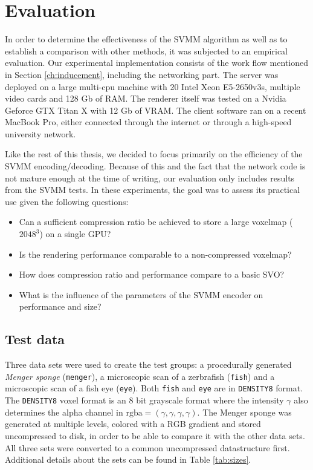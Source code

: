 \chapter{Evaluation}  \label{ch:evaluation}
%
In order to determine the effectiveness of the SVMM algorithm as well as to establish a comparison with other methods, it was subjected to an empirical evaluation. Our experimental implementation consists of the work flow mentioned in Section \ref{ch:inducement}, including the networking part. The server was deployed on a large multi-cpu machine with 20 Intel Xeon E5-2650v3s, multiple video cards and 128 Gb of RAM. The renderer itself was tested on a Nvidia Geforce GTX Titan X with 12 Gb of VRAM. The client software ran on a recent MacBook Pro, either connected through the internet or through a high-speed university network.

Like the rest of this thesis, we decided to focus primarily on the efficiency of the SVMM encoding/decoding. Because of this and the fact that the network code is not mature enough at the time of writing, our evaluation only includes results from the SVMM tests. In these experiments, the goal was to assess its practical use given the following questions:
\begin{itemize}
\item Can a sufficient compression ratio be achieved to store a large voxelmap ($2048^3$) on a single GPU?
\item Is the rendering performance comparable to a non-compressed voxelmap?
\item How does compression ratio and performance compare to a basic SVO?
\item What is the influence of the parameters of the SVMM encoder on performance and size?
\end{itemize}
%
\section{Test data}
%
Three data sets were used to create the test groups: a procedurally generated \emph{Menger sponge} (\texttt{menger}), a microscopic scan of a zerbrafish (\texttt{fish}) and a microscopic scan of a fish eye (\texttt{eye}). Both \texttt{fish} and \texttt{eye} are in \texttt{DENSITY8} format. The \texttt{DENSITY8} voxel format is an 8 bit grayscale format where the intensity $\gamma$ also determines the alpha channel in $\mathrm{rgba} = (\gamma, \gamma, \gamma, \gamma)$. The Menger sponge was generated at multiple levels, colored with a RGB gradient and stored uncompressed to disk, in order to be able to compare it with the other data sets. All three sets were converted to a common uncompressed datastructure first. Additional details about the sets can be found in Table \ref{tab:sizes}.
%
%
